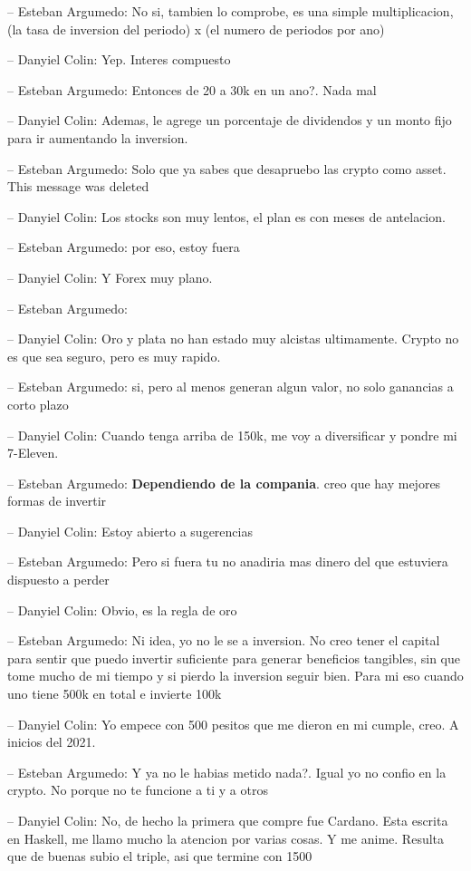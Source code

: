 -- Esteban Argumedo: No si, tambien lo comprobe, es una simple
multiplicacion, (la tasa de inversion del periodo) x (el numero de
periodos por ano)

-- Danyiel Colin: Yep. Interes compuesto

-- Esteban Argumedo: Entonces de 20 a 30k en un ano?. Nada mal

-- Danyiel Colin: Ademas, le agrege un porcentaje de dividendos y un
monto fijo para ir aumentando la inversion.

-- Esteban Argumedo: Solo que ya sabes que desapruebo las crypto como
asset. This message was deleted

-- Danyiel Colin: Los stocks son muy lentos, el plan es con meses de
antelacion.

-- Esteban Argumedo: por eso, estoy fuera

-- Danyiel Colin: Y Forex muy plano.

-- Esteban Argumedo:

-- Danyiel Colin: Oro y plata no han estado muy alcistas ultimamente.
Crypto no es que sea seguro, pero es muy rapido.

-- Esteban Argumedo: si, pero al menos generan algun valor, no solo
ganancias a corto plazo

-- Danyiel Colin: Cuando tenga arriba de 150k, me voy a diversificar y
pondre mi 7-Eleven.

-- Esteban Argumedo: \textbf{Dependiendo de la compania}. creo que hay
mejores formas de invertir

-- Danyiel Colin: Estoy abierto a sugerencias

-- Esteban Argumedo: Pero si fuera tu no anadiria mas dinero del que
estuviera dispuesto a perder

-- Danyiel Colin: Obvio, es la regla de oro

-- Esteban Argumedo: Ni idea, yo no le se a inversion. No creo tener el
capital para sentir que puedo invertir suficiente para generar
beneficios tangibles, sin que tome mucho de mi tiempo y si pierdo la
inversion seguir bien. Para mi eso cuando uno tiene 500k en total e
invierte 100k

-- Danyiel Colin: Yo empece con 500 pesitos que me dieron en mi cumple,
creo. A inicios del 2021.

-- Esteban Argumedo: Y ya no le habias metido nada?. Igual yo no confio
en la crypto. No porque no te funcione a ti y a otros

-- Danyiel Colin: No, de hecho la primera que compre fue Cardano. Esta
escrita en Haskell, me llamo mucho la atencion por varias cosas. Y me
anime. Resulta que de buenas subio el triple, asi que termine con 1500

